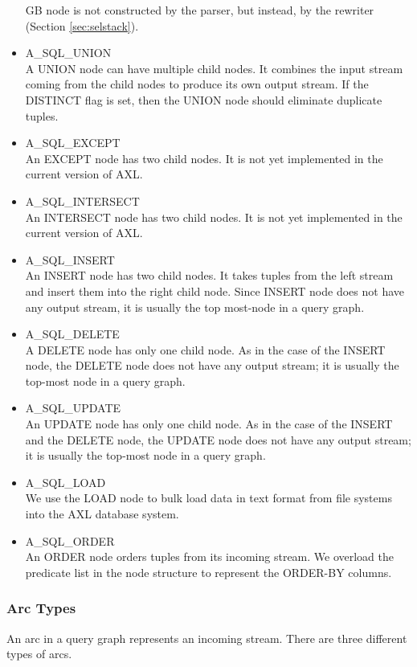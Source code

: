\begin{itemize}
  GB node is not constructed by the parser, but instead, by the
  rewriter (Section \ref{sec:selstack}).
\item A\_SQL\_UNION\\
  A UNION node can have multiple child nodes. It combines the input
  stream coming from the child nodes to produce its own output stream.
  If the DISTINCT flag is set, then the UNION node should eliminate
  duplicate tuples. 
\item A\_SQL\_EXCEPT\\
  An EXCEPT node has two child nodes. It is not yet implemented in the
  current version of AXL.
\item A\_SQL\_INTERSECT\\
  An INTERSECT node has two child nodes. It is not yet implemented in
  the current version of AXL.
\item A\_SQL\_INSERT\\
  An INSERT node has two child nodes. It takes tuples from the left
  stream and insert them into the right child node. Since INSERT node
  does not have any output stream, it is usually the top most-node in
  a query graph.
\item A\_SQL\_DELETE\\
  A DELETE node has only one child node. As in the case of the INSERT
  node, the DELETE node does not have any output stream; it is usually
  the top-most node in a query graph.
\item A\_SQL\_UPDATE\\
  An UPDATE node has only one child node. As in the case of the INSERT
  and the DELETE node, the UPDATE node does not have any output
  stream; it is usually the top-most node in a query graph.
\item A\_SQL\_LOAD \\
  We use the LOAD node to bulk load data in text format from file
  systems into the AXL database system.
\item A\_SQL\_ORDER \\
  An ORDER node orders tuples from its incoming stream. We overload
  the predicate list in the node structure to represent the ORDER-BY
  columns.
\end{itemize}

\subsubsection*{Arc Types}
An arc in a query graph represents an incoming stream. There are
three different types of arcs. 

